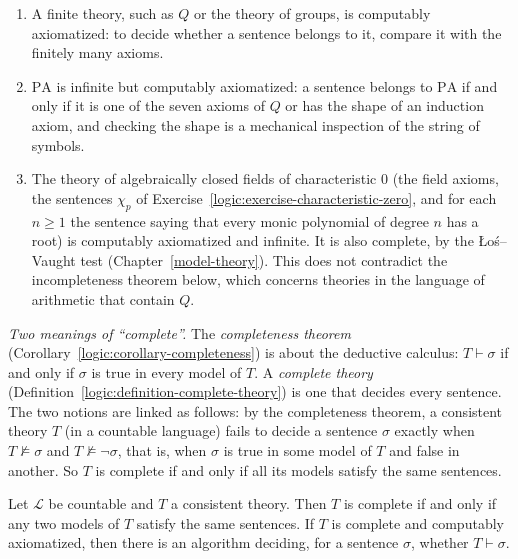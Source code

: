 \begin{example}\label{logic:example-computably-axiomatized}
\begin{enumerate}
\item A finite theory, such as $Q$ or the theory of groups, is computably axiomatized: to decide whether a sentence belongs to it, compare it with the finitely many axioms.
\item $\mathrm{PA}$ is infinite but computably axiomatized: a sentence belongs to $\mathrm{PA}$ if and only if it is one of the seven axioms of $Q$ or has the shape of an induction
axiom, and checking the shape is a mechanical inspection of the string of symbols.
\item The theory of algebraically closed fields of characteristic $0$ (the field axioms, the sentences $\chi_p$ of Exercise~\ref{logic:exercise-characteristic-zero}, and for each
$n \geq 1$ the sentence saying that every monic polynomial of degree $n$ has a root) is computably axiomatized and infinite. It is also complete, by the Łoś--Vaught test
(Chapter~\ref{model-theory}). This does not contradict the incompleteness theorem below, which concerns theories in the language of arithmetic that contain $Q$.
\end{enumerate}
\end{example}

\begin{remark}\label{logic:remark-two-completeness}
\emph{Two meanings of ``complete''.} The \emph{completeness theorem} (Corollary~\ref{logic:corollary-completeness}) is about the deductive calculus: $T \vdash \sigma$ if and only if
$\sigma$ is true in every model of $T$. A \emph{complete theory} (Definition~\ref{logic:definition-complete-theory}) is one that decides every sentence. The two notions are
linked as follows: by the completeness theorem, a consistent theory $T$ (in a countable language) fails to decide a sentence $\sigma$ exactly when $T \not\models \sigma$ and
$T \not\models \neg\sigma$, that is, when $\sigma$ is true in some model of $T$ and false in another. So $T$ is complete if and only if all its models satisfy the same sentences.
\end{remark}

\begin{proposition}\label{logic:proposition-complete-decidable}
Let $\mathcal{L}$ be countable and $T$ a consistent theory. Then $T$ is complete if and only if any two models of $T$ satisfy the same sentences. If $T$ is complete and
computably axiomatized, then there is an algorithm deciding, for a sentence $\sigma$, whether $T \vdash \sigma$.
\end{proposition}

